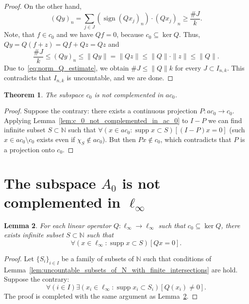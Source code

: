 \documentclass[a4paper,14pt]{article} %
\DeclareMathOperator{\supp}{supp}
\theoremstyle{plain}
\newtheorem{theorem}{Theorem}[section]
\newtheorem{lemma}[theorem]{Lemma}
\theoremstyle{definition}
\begin{document}
\begin{proof}
	On the other hand,
	\begin{equation}
		\label{eq:non_complemented_sum_cardinality}
		(Qy)_n = \sum_{j \in J}
		(\operatorname{sign}(Qx_j)_n)
		\cdot (Qx_j)_n \geq \frac{\# J}{k}
		.
	\end{equation}
	Note, that $f\in c_0$ and we have $Qf = 0$, because $c_0 \subseteq \ker Q$.
	Thus, $Qy = Q(f+z) = Qf + Qz = Qz$ and
	\begin{equation}
		\label{eq:norm_Q_estimate}
		\frac{\# J}{k} \leq (Qy)_n \leq \|Qy\| = \|Qz\| \leq \|Q\| \cdot \|z\| \leq \|Q\|
		.
	\end{equation}
	Due to~\eqref{eq:norm_Q_estimate}, we obtain $\# J \leq \|Q\| k$ for every $J\subset I_{n,k}$.
	This contradicts that $I_{n,k}$ is uncountable,
	and we are done.
\end{proof}

\begin{theorem}
	The subspace $c_0$ is not complemented in $ac_0$.
\end{theorem}

\begin{proof}
	Suppose the contrary:
	there exists a continuous projection $P: ac_0 \to c_0$.
	Applying Lemma~\ref{lem:c_0_not_complemented_in_ac_0} to $I-P$
	we can find infinite subset $S\subset\mathbb{N}$
	such that $\forall(x\in ac_0 : \supp x \subset S)[(I-P)x = 0]$
	(such $x \in ac_0 \setminus c_0$ exists even if $\chi_S \notin ac_0$).
	But then $Px\notin c_0$,
	which contradicts that $P$ is a projection onto $c_0$.
\end{proof}





\section{The subspace $A_0$ is not complemented in $\ell_\infty$}
\label{sec:A0_in_ell_infty}



\begin{lemma}
	\label{lem:c_0_not_complemented}
	For each linear operator $Q: \ell_\infty \to \ell_{\infty}$ such that $c_0\subseteq \ker Q$,
	there exists infinite subset $S \subset \mathbb{N}$ such that
	\begin{equation}
		\forall(x \in \ell_\infty : \supp x \subset S)[Qx = 0]
		.
	\end{equation}
\end{lemma}

\begin{proof}
	Let $\{S_i\}_{i \in I}$ be a family of subsets of $\mathbb{N}$
	such that conditions of Lemma~\ref{lem:uncountable_subsets_of_N_with_finite_intersections} are hold.
	Suppose the contrary:
	\begin{equation}
		\forall(i\in I)\exists(x_i \in \ell_\infty : \supp x_i \subset S_i)[Q(x_i) \neq 0]
		.
	\end{equation}
	The proof is completed with the same argument as Lemma~\ref{lem:c_0_not_complemented}.

\end{proof}
\end{document}
